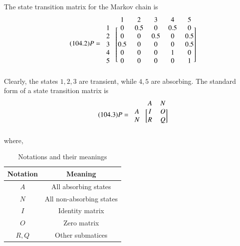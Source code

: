 \documentclass[journal,12pt,twocolumn]{IEEEtran}
\begin{document}
The state transition matrix for the Markov chain is
\begin{align}
\tag{104.2}
\label{eq:p}
    P=\begin{blockarray}{cccccc}
&1 & 2 & 3 & 4 & 5 \\
\begin{block}{c[ccccc]}
  1 & 0 & 0.5 & 0 & 0.5 & 0 \\
  2 & 0 & 0 & 0.5 & 0 & 0.5 \\
  3 & 0.5 & 0 & 0 & 0 & 0.5 \\
  4 & 0 & 0 & 0 & 1 & 0 \\
  5 & 0 & 0 & 0 & 0 & 1 \\
\end{block}
\end{blockarray}
\end{align}
Clearly, the states $1,2,3$ are transient, while $4,5$ are absorbing. The standard form of a state transition matrix is
\begin{align}
\tag{104.3}
\label{eq:std}
    P=\begin{blockarray}{ccc}
&A & N \\
\begin{block}{c[cc]}
  A & I & O  \\
  N & R & Q \\
\end{block}
\end{blockarray}
\end{align}
where,
\begin{table}[h!]
\centering
\caption{Notations and their meanings}
\label{table:2}
\begin{tabular}{|c|c|}
    \hline
    Notation & Meaning \\
    \hline
    $A$ & All absorbing states\\[1ex]
    \hline
    $N$ & All non-absorbing states\\[1ex]
    \hline
    $I$ & Identity matrix\\[1ex]
    \hline
    $O$ & Zero matrix\\[1ex]
    \hline
    $R,Q$ & Other submatices\\[1ex]
    \hline
\end{tabular}
\end{table}
\end{document}
